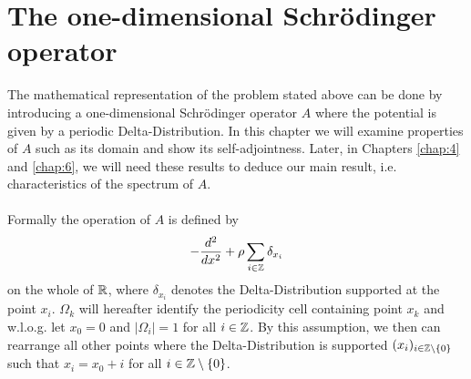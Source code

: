 \chapter{The one-dimensional Schrödinger operator} \label{chap:3}

The mathematical representation of the problem stated above can be done by introducing a one-dimensional Schrödinger operator $A$ where the potential is given by a periodic Delta-Distribution. In this chapter we will examine properties of $A$ such as its domain and show its self-adjointness. Later, in Chapters \ref{chap:4} and \ref{chap:6}, we will need these results to deduce our main result, i.e. characteristics of the spectrum of $A$. ~\\ ~\\
Formally the operation of $A$ is defined by
\begin{equation}
	- \frac{d^{2}}{dx^{2}} + \rho \sum_{i \in \mathbb{Z}} \delta_{x_{i}} \label{the-operator-A-formally}
\end{equation}
on the whole of $\mathbb{R}$, where $\delta_{x_{i}}$ denotes the Delta-Distribution supported at the point $x_{i}$. $\Omega_{k}$ will hereafter identify the periodicity cell containing point $x_{k}$ and w.l.o.g. let $x_{0} = 0$ and $|\Omega_{i}| = 1$ for all $i \in \mathbb{Z}$. By this assumption, we then can rearrange all other points where the Delta-Distribution is supported $(x_{i})_{i \in \mathbb{Z} \setminus \{0\}}$ such that $x_{i} = x_{0} + i$ for all $i \in \mathbb{Z} \setminus \{0\}$. 
~\\  

